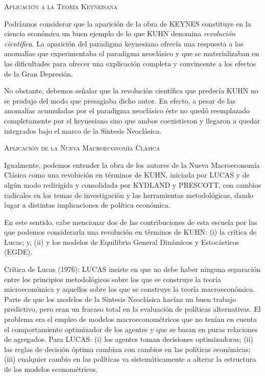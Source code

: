 \documentclass[10pt,a4paper]{article}
\begin{document}
\textsc{Aplicación a la Teoría Keyneisana}

Podríamos considerar que la aparición de la obra de KEYNES constituye en la ciencia económica un buen ejemplo de lo que KUHN denomina \textit{revolución científica}. La aparición del paradigma keynesiano ofrecía una respuesta a las anomalías que experimentaba el paradigma neoclásico y que se materializaban en las dificultades para ofrecer una explicación completa y convincente a los
efectos de la Gran Depresión.

No obstante, debemos señalar que la revolución científica que predecía KUHN no se produjo del modo que presagiaba dicho autor. En efecto, a pesar de las anomalías acumuladas por el paradigma neoclásico éste no quedó reemplazado completamente por el keynesiano sino que ambos coexistieron y llegaron a quedar integrados bajo el marco de la Síntesis Neoclásica.

\textsc{Aplicación de la Nueva Macroeconomía Clásica}

Igualmente, podemos entender la obra de los autores de la Nueva Macroeconomía Clásica como una revolución en términos de KUHN, iniciada por LUCAS y de algún modo redirigida y consolidada por KYDLAND y PRESCOTT, con cambios radicales en los temas de investigación y las herramientas metodológicas, dando lugar a distintas implicaciones de política económica.

En este sentido, cabe mencionar dos de las contribuciones de esta escuela por las que podemos considerarla una revolución en términos de KUHN: (i) la crítica de Lucas; y, (ii) y los modelos de Equilibrio General Dinámicos y Estocásticos (EGDE).


Crítica de Lucas (1976): LUCAS insiste en que no debe haber ninguna separación entre los principios metodológicos sobre los que se construye la teoría microeconómica y aquellos sobre los que se construye la teoría macroeconómica. Parte de que los modelos de la Síntesis Neoclásica hacían un buen trabajo predictivo, pero eran un fracaso total en la evaluación de políticas alternativas. El problema era el empleo de modelos macroeconométricos que no tenían en cuenta el comportamiento optimizador de los agentes y que se basan en puras relaciones de agregados. Para LUCAS: (i) los agentes toman decisiones optimizadoras; (ii) las reglas de decisión óptima cambian con cambios en las políticas económicas; (iii) cualquier cambio en las políticas va sistemáticamente a alterar la estructura de los modelos econométricos.
\end{document}
